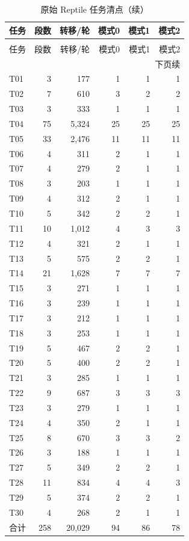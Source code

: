 \documentclass[UTF8,11pt]{ctexart}
\begin{document}
\begingroup\small
\begin{longtable}{lrrrrr}
\caption{原始全部合格 Reptile 任务；每个任务在四个epoch中各访问一次。模式列是任务内方向排序规则确定的段数，不是逐模式转移频数或最终混合概率。}\label{tab:reptile-task-accounting}\\
\toprule
任务 & 段数 & 转移/轮 & 模式0 & 模式1 & 模式2\\
\midrule
\endfirsthead
\caption[]{原始 Reptile 任务清点（续）}\\
\toprule
任务 & 段数 & 转移/轮 & 模式0 & 模式1 & 模式2\\
\midrule
\endhead
\midrule
\multicolumn{6}{r}{下页续}\\
\endfoot
\bottomrule
\endlastfoot
T01 & 3 & 177 & 1 & 1 & 1\\
T02 & 7 & 610 & 3 & 2 & 2\\
T03 & 3 & 333 & 1 & 1 & 1\\
T04 & 75 & 5,324 & 25 & 25 & 25\\
T05 & 33 & 2,476 & 11 & 11 & 11\\
T06 & 4 & 311 & 2 & 1 & 1\\
T07 & 4 & 279 & 2 & 1 & 1\\
T08 & 3 & 203 & 1 & 1 & 1\\
T09 & 4 & 312 & 2 & 1 & 1\\
T10 & 5 & 342 & 2 & 2 & 1\\
T11 & 10 & 1,012 & 4 & 3 & 3\\
T12 & 4 & 321 & 2 & 1 & 1\\
T13 & 5 & 575 & 2 & 2 & 1\\
T14 & 21 & 1,628 & 7 & 7 & 7\\
T15 & 3 & 271 & 1 & 1 & 1\\
T16 & 3 & 239 & 1 & 1 & 1\\
T17 & 3 & 212 & 1 & 1 & 1\\
T18 & 3 & 253 & 1 & 1 & 1\\
T19 & 5 & 467 & 2 & 2 & 1\\
T20 & 5 & 400 & 2 & 2 & 1\\
T21 & 3 & 285 & 1 & 1 & 1\\
T22 & 9 & 687 & 3 & 3 & 3\\
T23 & 3 & 279 & 1 & 1 & 1\\
T24 & 4 & 350 & 2 & 1 & 1\\
T25 & 8 & 670 & 3 & 3 & 2\\
T26 & 3 & 188 & 1 & 1 & 1\\
T27 & 5 & 349 & 2 & 2 & 1\\
T28 & 11 & 834 & 4 & 4 & 3\\
T29 & 5 & 374 & 2 & 2 & 1\\
T30 & 4 & 268 & 2 & 1 & 1\\
合计 & 258 & 20,029 & 94 & 86 & 78\\
\end{longtable}
\endgroup
\end{document}
